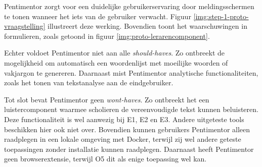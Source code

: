 \medspace

Pentimentor zorgt voor een duidelijke gebruikerservaring door meldingsschermen te tonen wanneer het iets van de gebruiker verwacht. Figuur \ref{img:step-1-proto-vraagstelling} illustreert deze werking. Bovendien toont het waarschuwingen in formulieren, zoals getoond in figuur \ref{img:proto-lerarencomponent}.

\medspace

Echter voldoet Pentimentor niet aan alle \textit{should-haves}. Zo ontbreekt de mogelijkheid om automatisch een woordenlijst met moeilijke woorden of vakjargon te genereren. Daarnaast mist Pentimentor analytische functionaliteiten, zoals het tonen van tekstanalyse aan de eindgebruiker.

\medspace

Tot slot bevat Pentimentor geen \textit{wont-haves}. Zo ontbreekt het een luistercomponent waarmee scholieren de vereenvoudigde tekst kunnen beluisteren. Deze functionaliteit is wel aanwezig bij E1, E2 en E3. Andere uitgeteste tools beschikken hier ook niet over. Bovendien kunnen gebruikers Pentimentor alleen raadplegen in een lokale omgeving met Docker, terwijl zij wel andere geteste toepassingen zonder installatie kunnen raadplegen. Daarnaast heeft Pentimentor geen browserextensie, terwijl O5 dit als enige toepassing wel kan.